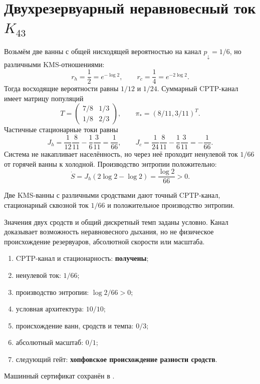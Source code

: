 \chapter{Двухрезервуарный неравновесный ток
\texorpdfstring{$K_{43}$}{K43}}
\label{ch:v10-k43-two-reservoir-current}

Возьмём две ванны с общей нисходящей вероятностью на канал
$p_\downarrow=1/6$, но различными KMS-отношениями:
\begin{equation}
 r_h=\frac12=e^{-\log2},\qquad r_c=\frac14=e^{-2\log2}.
\end{equation}
Тогда восходящие вероятности равны $1/12$ и $1/24$. Суммарный CPTP-канал
имеет матрицу популяций
\begin{equation}
 T=\begin{pmatrix}7/8&1/3\\1/8&2/3\end{pmatrix},
 \qquad \pi_*=(8/11,3/11)^T.
\end{equation}
Частичные стационарные токи равны
\begin{equation}
 J_h=\frac1{12}\frac8{11}-\frac16\frac3{11}=\frac1{66},
 \qquad
 J_c=\frac1{24}\frac8{11}-\frac16\frac3{11}=-\frac1{66}.
\end{equation}
Система не накапливает населённость, но через неё проходит ненулевой ток
$1/66$ от горячей ванны к холодной. Производство энтропии положительно:
\begin{equation}
 \dot S=J_h(2\log2-\log2)=\frac{\log2}{66}>0.
\end{equation}

\begin{theorem}
Две KMS-ванны с различными сродствами дают точный CPTP-канал,
стационарный сквозной ток $1/66$ и положительное производство энтропии.
\end{theorem}

\begin{nogocriterion}
Значения двух сродств и общий дискретный темп заданы условно. Канал
доказывает возможность неравновесного дыхания, но не физическое происхождение
резервуаров, абсолютной скорости или масштаба.
\end{nogocriterion}

\begin{protocol}\begin{enumerate}
\item CPTP-канал и стационарность: \textbf{получены};
\item ненулевой ток: \textbf{$1/66$};
\item производство энтропии: \textbf{$\log2/66>0$};
\item условная архитектура: \textbf{$10/10$};
\item происхождение ванн, сродств и темпа: \textbf{$0/3$};
\item абсолютный масштаб: \textbf{$0/1$};
\item следующий гейт: \textbf{хопфовское происхождение разности сродств}.
\end{enumerate}\end{protocol}

Машинный сертификат сохранён в
.